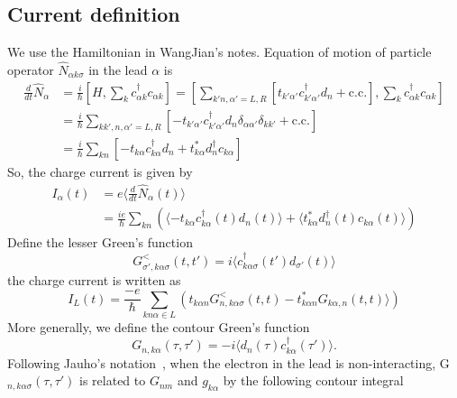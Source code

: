 \documentclass[11pt,a4paper]{article}
\begin{document}
\subsection{Current definition}
We use the Hamiltonian in WangJian's notes. Equation of motion of particle operator $\hat{N}_{\alpha k\sigma}$ in the lead $\alpha$ is
\begin{equation}
\begin{split}
\frac{d}{dt}\hat{N}_{\alpha} &= \frac{i}{\hbar}[H, \sum_{k}c_{\alpha k}^{\dag}c_{\alpha k}] = \left[\sum_{k'n, \alpha'=L, R}\left[t_{k' \alpha'} c_{k' \alpha'}^{\dag} d_{n}+\mathrm{c.c.}\right], \sum_{k}c_{\alpha k}^{\dag}c_{\alpha k}\right]\\
&=\frac{i}{\hbar}\sum_{kk',n, \alpha'=L, R}\left[ -t_{k' \alpha'} c_{k' \alpha' }^{\dag} d_{n}\delta_{\alpha\alpha'}\delta_{kk'}+\mathrm{c.c.}\right]\\
&=\frac{i}{\hbar}\sum_{kn}[-t_{k \alpha} c_{k \alpha}^{\dag} d_{n} + t_{k \alpha}^{*} d_{n}^{\dag}c_{k \alpha}]
\end{split}
\end{equation}
So, the charge current is given by
\begin{equation}
\begin{split}
I_{\alpha}(t) &= e\langle\frac{d}{dt}\hat{N}_{\alpha}(t)\rangle \\
&=\frac{ie}{\hbar}\sum_{kn}(\langle -t_{k \alpha} c_{k \alpha}^{\dag}(t) d_{n}(t)\rangle + \langle t_{k \alpha}^{*} d_{n}^{\dag}(t)c_{k \alpha}(t)\rangle)
\end{split}
\end{equation}
Define the lesser Green's function
\begin{equation}
G_{\sigma',k\alpha\sigma}^{<}(t,t') = i\langle c_{k\alpha\sigma}^{\dag}(t') d_{\sigma'}(t)\rangle 
\end{equation}
the charge current is written as
\begin{equation}
I_{L}(t)=\frac{-e}{\hbar}\sum_{kn\alpha\in L}(t_{k\alpha n}G_{n,k\alpha\sigma}^{<}(t,t) - t_{k \alpha n}^{*} G_{k\alpha,n}(t,t)\rangle)
\end{equation}
More generally, we define the contour Green's function
\begin{equation}
G_{n,k\alpha}(\tau,\tau') = -i\langle  d_{n}(\tau) c_{k\alpha}^{\dag}(\tau')\rangle .
\end{equation}
Following Jauho's notation~\cite{Jauho}, when the electron in the lead is non-interacting, G$_{n,k\alpha\sigma}(\tau,\tau')$ is related to $G_{nm}$ and $g_{k\alpha}$ by the following contour integral
\end{document}
